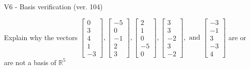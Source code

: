 \begin{exercise}
  \begin{exerciseTitle}V6 - Basis verification (ver. 104)\end{exerciseTitle}
  \begin{exerciseStatement}
    Explain why the vectors \(\left[\begin{array}{r}
0 \\
3 \\
4 \\
1 \\
-3
\end{array}\right] , \left[\begin{array}{r}
-5 \\
0 \\
-1 \\
2 \\
3
\end{array}\right] , \left[\begin{array}{r}
2 \\
1 \\
0 \\
-5 \\
0
\end{array}\right] , \left[\begin{array}{r}
3 \\
3 \\
-2 \\
3 \\
-2
\end{array}\right] , \text{ and } \left[\begin{array}{r}
-3 \\
-1 \\
3 \\
-3 \\
4
\end{array}\right]\) are or are not a basis of \(\mathbb{R}^5\)	



\end{exerciseStatement}
\end{exercise}
